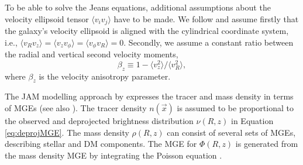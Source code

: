 \documentclass[useAMS,usenatbib]{mnras}
\newcommand*\diff{\mathop{}\!\mathrm{d}}
\newcommand*\Diff[1]{\mathop{}\!\mathrm{d^#1}}
\newcommand{\vect}[1]{\vec{#1}} %
\newcommand{\OLD}[1]{}
\begin{document}
To be able to solve the Jeans equations, additional assumptions about the velocity ellipsoid tensor $\langle v_i v_j\rangle$ have to be made. We follow \citet{Cap08} and assume firstly that the galaxy's velocity ellipsoid is aligned with the cylindrical coordinate system, i.e., $\langle v_R v_z\rangle = \langle v_z v_\phi \rangle = \langle v_\phi v_R \rangle = 0$. Secondly, we assume a constant ratio between the radial and vertical second velocity moments, 
\begin{equation}
\beta_z \equiv 1 - \langle v_z^2 \rangle / \langle v_R^2\rangle, \label{eq:bz}
\end{equation}
where $\beta_z$ is the velocity anisotropy parameter. \OLD{This reduces the Jeans equations to two equations for $\langle v_z^2 \rangle$ and $\langle v_\phi^2 \rangle$ which can be solved by means of one integration,
\begin{eqnarray}
n \langle v_z^2 \rangle (R,z) &=& \int_0^\infty n \frac{\partial \Phi}{\partial z} \diff z \label{eq:Jeans1}\\
n \langle v_\phi^2 \rangle (R,z) &=& R \frac{\partial}{\partial R} \left( \frac{n \langle v_z^2 \rangle}{1-\beta_z} \right) + \frac{n \langle v_z^2 \rangle}{1 - \beta_z} + R n \frac{\partial \Phi}{\partial R},\label{eq:Jeans2}
\end{eqnarray}
where $n(\vect{x}) \equiv \int f(\vect{x},\vect{v}) \Diff3 v$ is the number density of (stellar) tracers and $\Phi(\vect{x})$ the galaxy's gravitational potential generated by the mass density $\rho(\vect{x})$.}

The JAM modelling approach by \citet{Cap08} expresses the tracer and mass density in terms of MGEs (see also \citealt{1994A&A...285..723E}). The tracer density $n(\vect{x})$ is assumed to be proportional to the observed and deprojected brightness distribution $\nu(R,z)$ in Equation \eqref{eq:deprojMGE}. The mass density $\rho(R,z)$ can consist of several sets of MGEs, describing stellar and DM components. The MGE for $\Phi(R,z)$ is generated from the mass density MGE by integrating the Poisson equation \citep{1994A&A...285..723E}. \OLD{Equations \eqref{eq:Jeans1} and \eqref{eq:Jeans2} together with \eqref{eq:bz} provide the velocity dispersion tensor $\langle v_i v_j \rangle(R,z) = \langle v_i^2 \rangle(R,z)$ (with $i,j \in \{ R,\phi, z\}$ and $\langle v_i v_j \rangle=0$ if $i\neq j$).}
\end{document}
